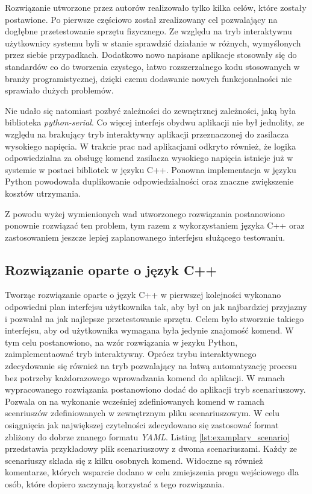 Rozwiązanie utworzone przez autorów realizowało tylko kilka celów, które zostały postawione. Po pierwsze częściowo został zrealizowany cel pozwalający na dogłębne przetestowanie sprzętu fizycznego. Ze względu na tryb interaktywnu użytkownicy systemu byli w stanie sprawdzić działanie w różnych, wymyślonych przez siebie przypadkach. Dodatkowo nowo napisane aplikacje stosowały się do standardów co do tworzenia czystego, łatwo rozszerzalnego kodu stosowanych w branży programistycznej, dzięki czemu dodawanie nowych funkcjonalności nie sprawiało dużych problemów.

Nie udało się natomiast pozbyć zależności do zewnętrznej zależności, jaką była biblioteka \emph{python-serial}. Co więcej interfejs obydwu aplikacji nie był jednolity, ze względu na brakujący tryb interaktywny aplikacji przeznaczonej do zasilacza wysokiego napięcia. W trakcie prac nad aplikacjami odkryto również, że logika odpowiedzialna za obsługę komend zasilacza wysokiego napięcia istnieje już w systemie w postaci bibliotek w języku C++. Ponowna implementacja w języku Python powodowała duplikowanie odpowiedzialności oraz znaczne zwiększenie kosztów utrzymania.

Z powodu wyżej wymienionych wad utworzonego rozwiązania postanowiono ponownie rozwiązać ten problem, tym razem z wykorzystaniem języka C++ oraz zastosowaniem jeszcze lepiej zaplanowanego interfejsu służącego testowaniu.

\subsection{Rozwiązanie oparte o język C++}

Tworząc rozwiązanie oparte o język C++ w pierwszej kolejności wykonano odpowiedni plan interfejsu użytkownika tak, aby był on jak najbardziej przyjazny i pozwalał na jak najlepsze przetestowanie sprzętu. Celem było stworznie takiego interfejsu, aby od użytkownika wymagana była jedynie znajomość komend. W tym celu postanowiono, na wzór rozwiązania w jezyku Python, zaimplementaować tryb interaktywny. Oprócz trybu interaktywnego zdecydowanie się również na tryb pozwalający na łatwą automatyzację procesu bez potrzeby każdorazowego wprowadzania komend do aplikacji. W ramach wypracowanego rozwiązania postanowiono dodać do aplikacji tryb scenariuszowy. Pozwala on na wykonanie wcześniej zdefiniowanych komend w ramach scenriuszów zdefiniowanych w zewnętrznym pliku scenariuszowym. W celu osiągnięcia jak największej czytelności zdecydowano się zastosować format zbliżony do dobrze znanego formatu \emph{YAML}. Listing \ref{lst:examplary_scenario} przedstawia przykładowy plik scenariuszowy z dwoma scenariuszami. Każdy ze scenariuszy składa się z kilku osobnych komend. Widoczne są również komentarze, których wsparcie dodano w celu zmiejszenia progu wejściowego dla osób, które dopiero zaczynają korzystać z tego rozwiązania.

